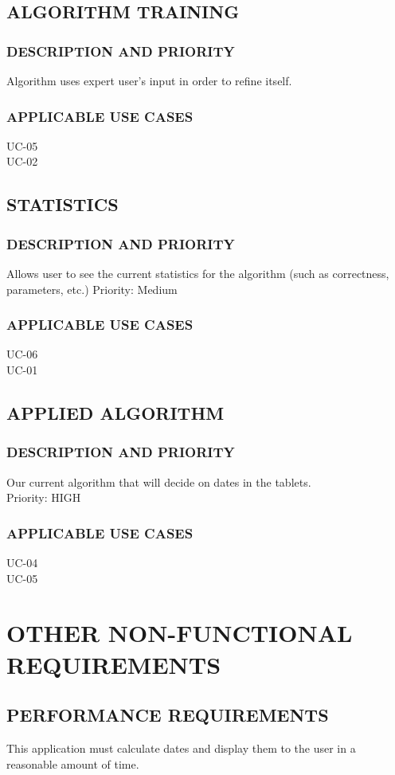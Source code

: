 \documentclass[11pt]{article}
\begin{document}
\subsection{ALGORITHM TRAINING}
\subsubsection{DESCRIPTION AND PRIORITY}
Algorithm uses expert user’s input in order to refine itself. 
\subsubsection{APPLICABLE USE CASES}
UC-05\\
UC-02

\subsection{STATISTICS}
\subsubsection{DESCRIPTION AND PRIORITY}
Allows user to see the current statistics for the algorithm (such as correctness, parameters, etc.)
Priority: Medium
\subsubsection{APPLICABLE USE CASES}
UC-06\\
UC-01

\subsection{APPLIED ALGORITHM}
\subsubsection{DESCRIPTION AND PRIORITY}
Our current algorithm that will decide on dates in the tablets.\\
Priority: HIGH
\subsubsection{APPLICABLE USE CASES}
UC-04\\
UC-05

\section{OTHER NON-FUNCTIONAL REQUIREMENTS}
\subsection{PERFORMANCE REQUIREMENTS}
This application must calculate dates and display them to the user in a reasonable amount of time.
\end{document}
